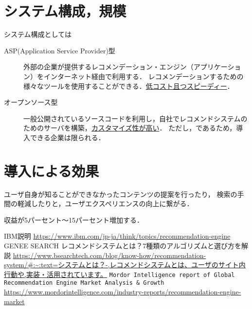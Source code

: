 \documentclass{jlreq}
\begin{document}
\section{システム構成，規模}
システム構成としては
\begin{description}
    \item[ASP(Application Service Provider)型]
    外部の企業が提供するレコメンデーション・エンジン（アプリケーション）をインターネット経由で利用する．
    レコメンデーションするための様々なツールを使用することができる．\uline{低コスト且つスピーディー}．
    \item[オープンソース型]
    一般公開されているソースコードを利用し，自社でレコメンドシステムのためのサーバを構築，\uline{カスタマイズ性が高い}．
    ただし，であるため，導入できる企業は限られる．
\end{description}

\section{導入による効果}
ユーザ自身が知ることができなかったコンテンツの提案を行ったり，
検索の手間の軽減したりと，ユーザエクスペリエンスの向上に繋がる．

収益が5パーセント～15パーセント増加する．

\begin{thebibliography}{99}
     IBM説明 \url{https://www.ibm.com/jp-ja/think/topics/recommendation-engine}
     GENEE SEARCH レコメンドシステムとは？7種類のアルゴリズムと選び方を解説 \url{https://www.bsearchtech.com/blog/know-how/recommendation-system/#:~:text=システムとは？-,レコメンドシステムとは、ユーザのサイト内行動や,実装・活用されています。}
     \verb|Mordor Intelligence report of Global Recommendation Engine Market Analysis & Growth| \url{https://www.mordorintelligence.com/industry-reports/recommendation-engine-market}
\end{thebibliography}
\end{document}

